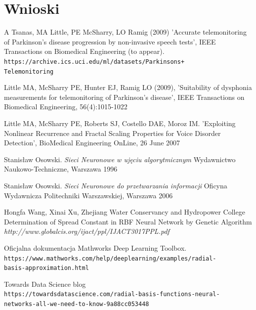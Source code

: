 \documentclass{article}
\begin{document}
\section{Wnioski}

\newpage
\begin{thebibliography}{9}

A Tsanas, MA Little, PE McSharry, LO Ramig (2009) 
'Accurate telemonitoring of Parkinson’s disease progression by non-invasive speech tests', 
IEEE Transactions on Biomedical Engineering (to appear). 
\\\texttt{https://archive.ics.uci.edu/ml/datasets/Parkinsons+\\Telemonitoring}

Little MA, McSharry PE, Hunter EJ, Ramig LO (2009), 
'Suitability of dysphonia measurements for telemonitoring of Parkinson's disease', 
IEEE Transactions on Biomedical Engineering, 56(4):1015-1022 

Little MA, McSharry PE, Roberts SJ, Costello DAE, Moroz IM. 
'Exploiting Nonlinear Recurrence and Fractal Scaling Properties for Voice Disorder Detection', 
BioMedical Engineering OnLine, 26 June 2007

Stanisław Osowski.
\textit{Sieci Neuronowe w ujęciu algorytmicznym}
Wydawnictwo Naukowo-Techniczne, Warszawa 1996

Stanisław Osowski.
\textit{Sieci Neuronowe do przetwarzania informacji}
Oficyna Wydawnicza Politechniki Warszawskiej, Warszawa 2006

Hongfa Wang, Xinai Xu, Zhejiang
Water Conservancy and Hydropower College
Determination of Spread Constant in RBF Neural Network by Genetic
Algorithm 
\textit{http://www.globalcis.org/ijact/ppl/IJACT3017PPL.pdf}

Oficjalna dokumentacja Mathworks Deep Learning Toolbox. 
\\\texttt{https://www.mathworks.com/help/deeplearning/examples/radial-\\basis-approximation.html}

Towards Data Science blog
\\\texttt{https://towardsdatascience.com/radial-basis-functions-neural-\\networks-all-we-need-to-know-9a88cc053448}


\end{thebibliography}
\newpage

\listoffigures
\newpage
\end{document}
